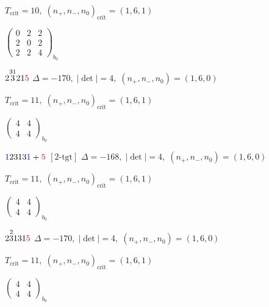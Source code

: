 \documentclass[10pt]{article}
\begin{document}
\hspace{1em}$T_{\text{crit}}=10,\; (n_+,n_-,n_0)_{\text{crit}}=(1,6,1)$

\hspace{2em}$\left(\begin{smallmatrix}0 & 2 & 2 \\ 2 & 0 & 2 \\ 2 & 2 & 4\end{smallmatrix}\right)_{\!b_0}$

\smallskip

$2\overset{31}{3}21\textcolor{red}{5}$ \quad $\Delta=-170,\; |\det|=4,\; (n_+,n_-,n_0)=(1,6,0)$

\hspace{1em}$T_{\text{crit}}=11,\; (n_+,n_-,n_0)_{\text{crit}}=(1,6,1)$

\hspace{2em}$\left(\begin{smallmatrix}4 & 4 \\ 4 & 4\end{smallmatrix}\right)_{\!b_0}$

\smallskip

$\textcolor{blue}{1}2313\textcolor{blue}{1}+\textcolor{red}{5}$ $\scriptstyle [2\text{-tgt}]$ \quad $\Delta=-168,\; |\det|=4,\; (n_+,n_-,n_0)=(1,6,0)$

\hspace{1em}$T_{\text{crit}}=11,\; (n_+,n_-,n_0)_{\text{crit}}=(1,6,1)$

\hspace{2em}$\left(\begin{smallmatrix}4 & 4 \\ 4 & 4\end{smallmatrix}\right)_{\!b_0}$

\smallskip

$2\overset{2}{3}131\textcolor{red}{5}$ \quad $\Delta=-170,\; |\det|=4,\; (n_+,n_-,n_0)=(1,6,0)$

\hspace{1em}$T_{\text{crit}}=11,\; (n_+,n_-,n_0)_{\text{crit}}=(1,6,1)$

\hspace{2em}$\left(\begin{smallmatrix}4 & 4 \\ 4 & 4\end{smallmatrix}\right)_{\!b_0}$

\smallskip
\end{document}
